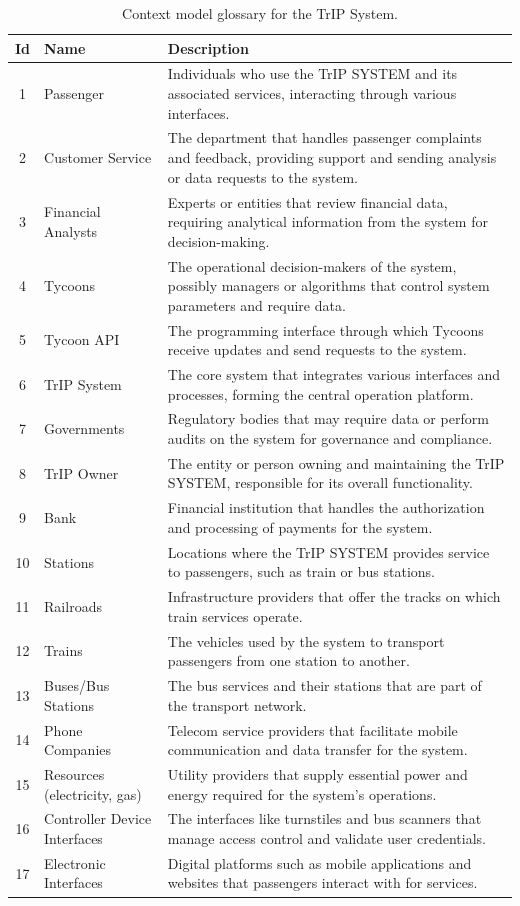 \begin{table}[H]
\centering
\begin{tabular}{@{}clp{9cm}@{}}
\toprule
\textbf{Id} & \textbf{Name} & \textbf{Description} \\
\midrule
1 & Passenger & Individuals who use the TrIP SYSTEM and its associated services, interacting through various interfaces. \\
2 & Customer Service & The department that handles passenger complaints and feedback, providing support and sending analysis or data requests to the system. \\
3 & Financial Analysts & Experts or entities that review financial data, requiring analytical information from the system for decision-making. \\
4 & Tycoons & The operational decision-makers of the system, possibly managers or algorithms that control system parameters and require data. \\
5 & Tycoon API & The programming interface through which Tycoons receive updates and send requests to the system. \\
6 & TrIP System & The core system that integrates various interfaces and processes, forming the central operation platform. \\
7 & Governments & Regulatory bodies that may require data or perform audits on the system for governance and compliance. \\
8 & TrIP Owner & The entity or person owning and maintaining the TrIP SYSTEM, responsible for its overall functionality. \\
9 & Bank & Financial institution that handles the authorization and processing of payments for the system. \\
10 & Stations & Locations where the TrIP SYSTEM provides service to passengers, such as train or bus stations. \\
11 & Railroads & Infrastructure providers that offer the tracks on which train services operate. \\
12 & Trains & The vehicles used by the system to transport passengers from one station to another. \\
13 & Buses/Bus Stations & The bus services and their stations that are part of the transport network. \\
14 & Phone Companies & Telecom service providers that facilitate mobile communication and data transfer for the system. \\
15 & Resources (electricity, gas) & Utility providers that supply essential power and energy required for the system’s operations. \\
16 & Controller Device Interfaces & The interfaces like turnstiles and bus scanners that manage access control and validate user credentials. \\
17 & Electronic Interfaces & Digital platforms such as mobile applications and websites that passengers interact with for services. \\
\bottomrule
\end{tabular}
\caption{Context model glossary for the TrIP System.}
\label{tab:glossary_context_view}
\end{table}

